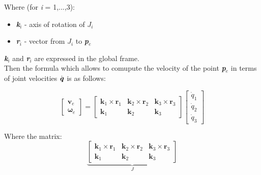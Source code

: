 \documentclass[a4paper]{article}
\begin{document}
\noindent Where (for \textit{i} = 1,...,3):

\begin{itemize}

\item \textbf{\textit{k}}$_{i}$ - axis of rotation of $J_{i}$
\item \textbf{\textit{r}}$_{i}$ - vector from $J_{i}$ to \textbf{\textit{p}}$_{e}$

\end{itemize}

\noindent \textbf{\textit{k}}$_{i}$ and \textbf{\textit{r}}$_{i}$ are expressed in the global frame. \\

\noindent Then the formula which allows to comupute the velocity of the point \textbf{\textit{p}}$_{e}$ in terms of joint velocities $\dot{\textbf{\textit{q}}}$ is as follows:

\begin{equation}
\begin{bmatrix}
       \boldsymbol{v}_{e} \\
       \boldsymbol{\omega}_{e}             
\end{bmatrix} = \begin{bmatrix}
       \boldsymbol{k}_{1} \times \boldsymbol{r}_{1} & \boldsymbol{k}_{2} \times \boldsymbol{r}_{2} & \boldsymbol{k}_{3} \times \boldsymbol{r}_{3} \\
       \boldsymbol{k}_{1} & \boldsymbol{k}_{2} & \boldsymbol{k}_{3}              
\end{bmatrix} \begin{bmatrix}
       \dot{q}_{1} \\
       \dot{q}_{2} \\
       \dot{q}_{3}             
\end{bmatrix}
\end{equation}

\noindent Where the matrix: \\


\begin{equation}
\underbrace{\begin{bmatrix}
       \boldsymbol{k}_{1} \times \boldsymbol{r}_{1} & \boldsymbol{k}_{2} \times \boldsymbol{r}_{2} & \boldsymbol{k}_{3} \times \boldsymbol{r}_{3} \\
       \boldsymbol{k}_{1} & \boldsymbol{k}_{2} & \boldsymbol{k}_{3}              
       \end{bmatrix}}_{J}
\end{equation}
\end{document}
